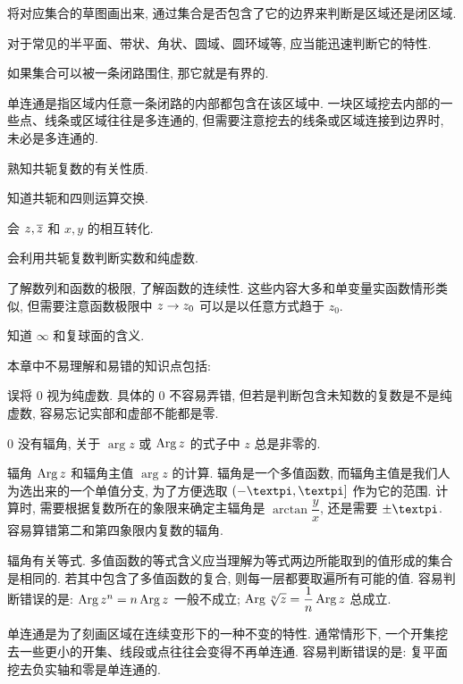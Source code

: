 \begin{conclusion}
  \begin{conclusion}
    \item 将对应集合的草图画出来, 通过集合是否包含了它的边界来判断是区域还是闭区域.
    \item 对于常见的半平面、带状、角状、圆域、圆环域等, 应当能迅速判断它的特性.
    \item 如果集合可以被一条闭路围住, 那它就是有界的.
    \item 单连通是指区域内任意一条闭路的内部都包含在该区域中.
    一块区域挖去内部的一些点、线条或区域往往是多连通的,  但需要注意挖去的线条或区域连接到边界时, 未必是多连通的.
  \end{conclusion}
  \item 熟知共轭复数的有关性质.
  \begin{conclusion}
    \item 知道共轭和四则运算交换.
    \item 会 $z,\overline z$ 和 $x,y$ 的相互转化.
    \item 会利用共轭复数判断实数和纯虚数.
  \end{conclusion}
  \item 了解数列和函数的极限, 了解函数的连续性. 这些内容大多和单变量实函数情形类似, 但需要注意函数极限中 $z\rightarrow z_0$ 可以是以任意方式趋于 $z_0$.
  \item 知道 $\infty$ 和复球面的含义.
\end{conclusion}

本章中不易理解和易错的知识点包括:
\begin{enuma}
  \item 误将 $0$ 视为纯虚数. 具体的 $0$ 不容易弄错, 但若是判断包含未知数的复数是不是纯虚数, 容易忘记实部和虚部不能都是零.
  \item $0$ 没有辐角, 关于 $\arg z$ 或 $\operatorname{Arg} z$ 的式子中 $z$ 总是非零的.
  \item 辐角 $\operatorname{Arg} z$ 和辐角主值 $\arg z$ 的计算. 辐角是一个多值函数, 而辐角主值是我们人为选出来的一个单值分支, 为了方便选取 $(-\cpi,\cpi]$ 作为它的范围. 计算时, 需要根据复数所在的象限来确定主辐角是 $\arctan\dfrac yx$, 还是需要 $\pm\cpi$. 
  容易算错第二和第四象限内复数的辐角.
  \item 辐角有关等式. 多值函数的等式含义应当理解为等式两边所能取到的值形成的集合是相同的. 若其中包含了多值函数的复合, 则每一层都要取遍所有可能的值.
  容易判断错误的是: $\operatorname{Arg} z^n=n\operatorname{Arg} z$ 一般不成立; $\operatorname{Arg} \sqrt[n]z=\dfrac1n\operatorname{Arg} z$ 总成立.
  \item 单连通是为了刻画区域在连续变形下的一种不变的特性. 通常情形下, 一个开集挖去一些更小的开集、线段或点往往会变得不再单连通.
  容易判断错误的是: 复平面挖去负实轴和零是单连通的.
\end{enuma}

